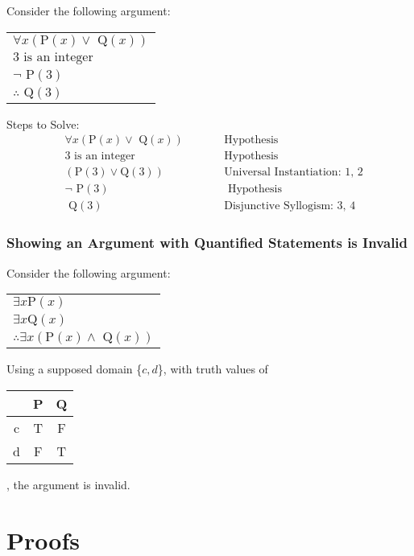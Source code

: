 \documentclass{article}
\begin{document}
Consider the following argument:
\begin{tabular}{l}
  \(\forall x (\text{P}(x) \lor \text{ Q}(x))\) \\
  \(3 \text{ is an integer}\)                   \\
  \(\lnot \text{ P}(3)\)                        \\
  \hline
  \(\therefore \text{ Q}(3)\)
\end{tabular}

\begin{center}
  Steps to Solve:
  \begin{align}
     & \forall x (\text{P}(x) \lor \text{ Q}(x)) &  & \qquad \text{Hypothesis}                    \\
     & 3 \text{ is an integer}                   &  & \qquad \text{Hypothesis}                    \\
     & (\text{P}(3) \lor \text{Q}(3))            &  & \qquad \text{Universal Instantiation: 1, 2} \\
     & \lnot \text{ P}(3)                        &  & \qquad \text{ Hypothesis}                   \\
     & \text{ Q}(3)                              &  & \qquad \text{Disjunctive Syllogism: 3, 4}
  \end{align}
\end{center}

\subsubsection{Showing an Argument with Quantified Statements is Invalid}

Consider the following argument:
\begin{tabular}{l}
  \(\exists x \text{P}(x)\) \\
  \(\exists x \text{Q}(x)\) \\
  \hline
  \(\therefore \exists x (\text{P}(x) \land \text{ Q}(x))\)
\end{tabular}

Using a supposed domain \{\(c, d\)\}, with truth values of
\begin{tabular}{c|cc}
    & P & Q \\
  \hline
  c & T & F \\
  d & F & T
\end{tabular},
the argument is invalid.

\section{Proofs}
\end{document}
